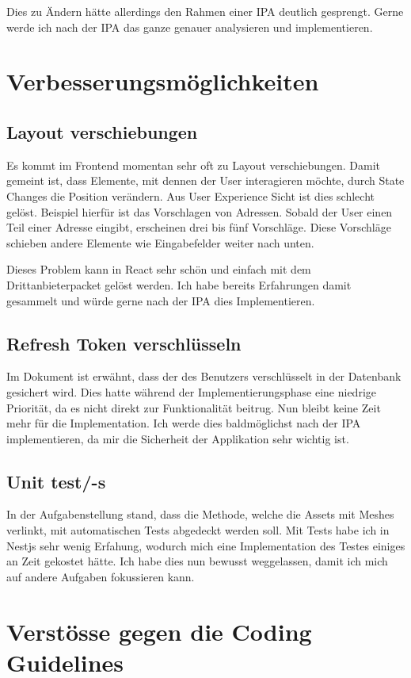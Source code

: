 Dies zu Ändern hätte allerdings den Rahmen einer IPA deutlich gesprengt. Gerne werde ich nach der IPA das ganze genauer analysieren und implementieren.
\section{Verbesserungsmöglichkeiten}
\subsection{Layout verschiebungen}
Es kommt im Frontend momentan sehr oft zu Layout verschiebungen. Damit gemeint ist, dass Elemente, mit dennen der User interagieren möchte, durch State Changes die Position verändern. Aus User Experience Sicht ist dies schlecht gelöst. Beispiel hierfür ist das Vorschlagen von Adressen. Sobald der User einen Teil einer Adresse eingibt, erscheinen drei bis fünf Vorschläge. Diese Vorschläge schieben andere Elemente wie Eingabefelder weiter nach unten.

Dieses Problem kann in React sehr schön und einfach mit dem Drittanbieterpacket \href{https://www.framer.com/motion/}{} gelöst werden. Ich habe bereits Erfahrungen damit gesammelt und würde gerne nach der IPA dies Implementieren.
\subsection{Refresh Token verschlüsseln}
Im Dokument ist erwähnt, dass der  des Benutzers verschlüsselt in der Datenbank gesichert wird. Dies hatte während der Implementierungsphase eine niedrige Priorität, da es nicht direkt zur Funktionalität beitrug. Nun bleibt keine Zeit mehr für die Implementation. Ich werde dies baldmöglichst nach der IPA implementieren, da mir die Sicherheit der Applikation sehr wichtig ist.
\subsection{Unit test/-s}
In der Aufgabenstellung stand, dass die Methode, welche die Assets mit Meshes verlinkt, mit automatischen Tests abgedeckt werden soll. Mit Tests habe ich in Nestjs sehr wenig Erfahung, wodurch mich eine Implementation des Testes einiges an Zeit gekostet hätte. Ich habe dies nun bewusst weggelassen, damit ich mich auf andere Aufgaben fokussieren kann.
\section{Verstösse gegen die Coding Guidelines}
